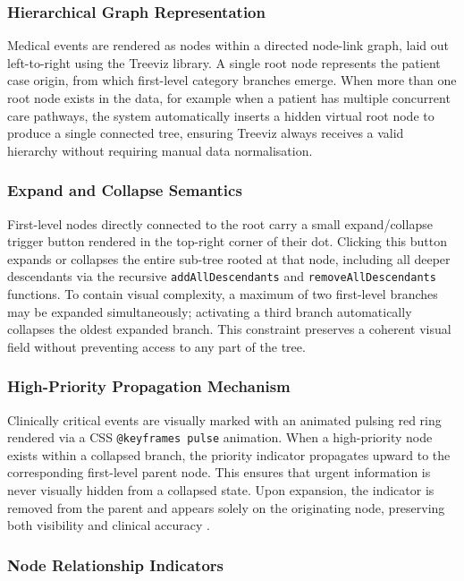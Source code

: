 \subsubsection{Hierarchical Graph Representation}

Medical events are rendered as nodes within a directed node-link graph, laid
out left-to-right using the Treeviz library. A single root node represents
the patient case origin, from which first-level category branches emerge.
When more than one root node exists in the data, for example when a patient
has multiple concurrent care pathways, the system automatically inserts a
hidden virtual root node to produce a single connected tree, ensuring Treeviz
always receives a valid hierarchy without requiring manual data normalisation.

\subsubsection{Expand and Collapse Semantics}

First-level nodes directly connected to the root carry a small expand/collapse
trigger button rendered in the top-right corner of their dot. Clicking this
button expands or collapses the entire sub-tree rooted at that node, including
all deeper descendants via the recursive \texttt{addAllDescendants} and
\texttt{removeAllDescendants} functions. To contain visual complexity, a
maximum of two first-level branches may be expanded simultaneously;
activating a third branch automatically collapses the oldest expanded branch.
This constraint preserves a coherent visual field without preventing access
to any part of the tree.

\subsubsection{High-Priority Propagation Mechanism}

Clinically critical events are visually marked with an animated pulsing red
ring rendered via a CSS \texttt{@keyframes pulse} animation. When a
high-priority node exists within a collapsed branch, the priority indicator
propagates upward to the corresponding first-level parent node. This ensures
that urgent information is never visually hidden from a collapsed state. Upon
expansion, the indicator is removed from the parent and appears solely on the
originating node, preserving both visibility and clinical accuracy
\cite{hospitalDashboards2022}.

\subsubsection{Node Relationship Indicators}

